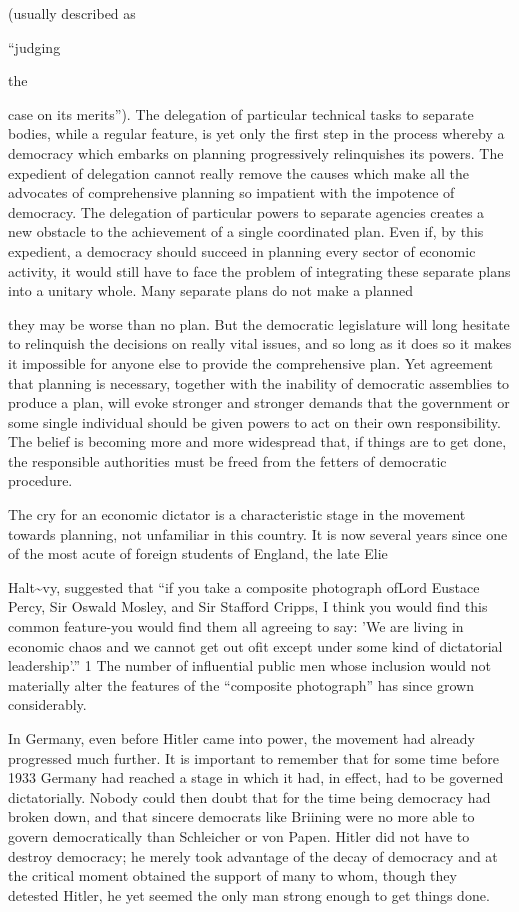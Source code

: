 \documentclass[11pt,openany]{book}
\begin{document}
(usually described as

``judging

the

case on its merits''). The delegation of particular technical tasks to separate bodies, while a regular feature, is yet only the first step in the process whereby a democracy which embarks on planning progressively relinquishes its powers. The expedient of delegation cannot really remove the causes which make all the advocates of comprehensive planning so impatient with the impotence of democracy. The delegation of particular powers to separate agencies creates a new obstacle to the achievement of a single coordinated plan. Even if, by this expedient, a democracy should succeed in planning every sector of economic activity, it would still have to face the problem of integrating these separate plans into a unitary whole. Many separate plans do not make a planned

they may be worse than no plan. But the democratic legislature will long hesitate to relinquish the decisions on really vital issues, and so long as it does so it makes it impossible for anyone else to provide the comprehensive plan. Yet agreement that planning is necessary, together with the inability of democratic assemblies to produce a plan, will evoke stronger and stronger demands that the government or some single individual should be given powers to act on their own responsibility. The belief is becoming more and more widespread that, if things are to get done, the responsible authorities must be freed from the fetters of democratic procedure.

The cry for an economic dictator is a characteristic stage in the movement towards planning, not unfamiliar in this country. It is now several years since one of the most acute of foreign students of England, the late Elie

Halt\textasciitilde{}vy, suggested that ``if you take a composite photograph ofLord Eustace Percy, Sir Oswald Mosley, and Sir Stafford Cripps, I think you would find this common feature-you would find them all agreeing to say: 'We are living in economic chaos and we cannot get out ofit except under some kind of dictatorial leadership'.'' 1 The number of influential public men whose inclusion would not materially alter the features of the ``composite photograph'' has since grown considerably.

In Germany, even before Hitler came into power, the movement had already progressed much further. It is important to remember that for some time before 1933 Germany had reached a stage in which it had, in effect, had to be governed dictatorially. Nobody could then doubt that for the time being democracy had broken down, and that sincere democrats like Briining were no more able to govern democratically than Schleicher or von Papen. Hitler did not have to destroy democracy; he merely took advantage of the decay of democracy and at the critical moment obtained the support of many to whom, though they detested Hitler, he yet seemed the only man strong enough to get things done.
\end{document}
